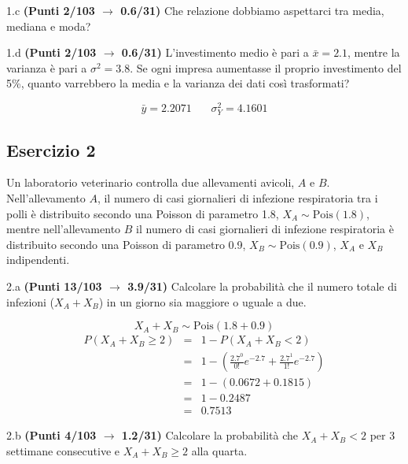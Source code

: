 \documentclass[
  11pt,
]{book}
\theoremstyle{mytheoremstyle}
\theoremstyle{mydefstyle}
\newenvironment{sol}
  {
  \begin{tcolorbox}[enhanced,breakable,arc=0.1mm,boxrule=1pt,colback=white,colframe=iblue,
  title=\bf \fontfamily{lmss}\selectfont \hspace{.5 cm} Soluzione,drop fuzzy shadow]

}{
\end{tcolorbox}
  }
\begin{document}
1.c \textbf{(Punti 2/103 \(\rightarrow\) 0.6/31)} Che relazione dobbiamo aspettarci tra media, mediana e moda?

1.d \textbf{(Punti 2/103 \(\rightarrow\) 0.6/31)} L'investimento medio è pari a \(\bar x=2.1\), mentre la varianza è pari a \(\sigma^2=3.8\).
Se ogni impresa aumentasse il proprio investimento del 5\%, quanto varrebbero la media e la varianza dei dati così trasformati?

\begin{sol}
\[
\bar y= 2.2071 ~~~~~~~~ \sigma^2_ Y= 4.1601
\]

\end{sol}

\subsection{Esercizio 2}\label{esercizio-2-49}

Un laboratorio veterinario controlla due allevamenti avicoli, \(A\) e \(B\). Nell'allevamento \(A\), il numero di casi giornalieri di infezione respiratoria tra i polli è distribuito secondo una Poisson di parametro 1.8, \(X_A \sim \text{Pois}(1.8)\), mentre nell'allevamento \(B\) il numero di casi giornalieri di infezione respiratoria è distribuito secondo una Poisson di parametro 0.9, \(X_B \sim \text{Pois}(0.9)\), \(X_A\) e \(X_B\) indipendenti.

2.a \textbf{(Punti 13/103 \(\rightarrow\) 3.9/31)} Calcolare la probabilità che il numero totale di infezioni (\(X_A + X_B\)) in un giorno sia maggiore o uguale a due.

\begin{sol}
\[
X_A + X_B \sim \text{Pois}(1.8+0.9)
\]
\begin{eqnarray*}
   P( X_A+X_B \geq 2 ) &=& 1-P( X_A+X_B < 2 ) \\                 &=& 1-\left( \frac{ 2.7 ^{ 0 }}{ 0 !}e^{- 2.7 }+\frac{ 2.7 ^{ 1 }}{ 1 !}e^{- 2.7 } \right)\\                 &=& 1-( 0.0672+0.1815 )\\                 &=& 1- 0.2487 \\                 &=&   0.7513 
\end{eqnarray*}

\end{sol}

2.b \textbf{(Punti 4/103 \(\rightarrow\) 1.2/31)} Calcolare la probabilità che \(X_A + X_B< 2\) per 3 settimane consecutive e \(X_A + X_B\ge 2\) alla quarta.
\end{document}

